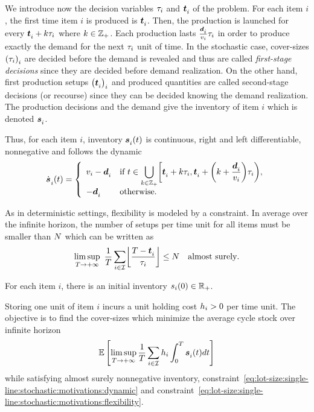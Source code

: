 We introduce now the decision variables $\tau_i$ and $\va t_i$ of the problem.
For each item $i$, the first time item $i$ is produced is $\va t_i$.
Then, the production is launched for every $\va t_i+k\cover_i$ where $k\in\mathbb{Z}_+$.
Each production lasts $\frac{\va\demand_i}{\rate_i}\cover_i$ in order to produce exactly the demand for the next $\tau_i$ unit of time.
In the stochastic case, cover-sizes $\bracket{\cover_i}_i$ are decided before the demand is revealed and thus are called \emph{first-stage decisions} since they are decided before demand realization.
On the other hand, first production setups $\bracket{\va t_i}_i$ and produced quantities are called second-stage decisions (or recourse) since they can be decided knowing the demand realization.
The production decisions and the demand give the inventory of item $i$ which is denoted $\va\inventory_i$.


Thus, for each item $i$, inventory $\va\inventory_i\bracket{t}$ is continuous, right and left differentiable, nonnegative and follows the dynamic
\begin{equation}\label{eq:lot-size:single-line:stochastic:motivations:dynamic}
  \dot{\va\inventory}_i\bracket{t} =
  \left\{
  \begin{array}{ll}
  \rate_i-\va\demand_i
  & \ds\mbox{if}\ t\in\bigcup_{k\in\ZZ_+} \left[\va t_i+k\cover_i,\va t_i+\bracket{k+\frac{\va\demand_i}{\rate_i}}\cover_i\right),
  \\
  -\va\demand_i
  & \mbox{otherwise}.
  \end{array}
  \right.
\end{equation}


As in deterministic settings, flexibility is modeled by a constraint.
In average over the infinite horizon, the number of setups per time unit for all items must be smaller than $N$ which can be written as
\begin{equation}\label{eq:lot-size:single-line:stochastic:motivations:flexibility}
  \limsup_{\horizon\rightarrow+\infty}\ \frac{1}{\horizon} \sum_{i\in\REF} \left\lfloor\frac{\horizon-\va t_i}{\cover_i}\right\rfloor \le \nbsetups \quad \mbox{almost surely}.
\end{equation}


For each item $i$, there is an initial inventory $s_i\bracket{0}\in\RR_+$.


Storing one unit of item $i$ incurs a unit holding cost $h_i>0$ per time unit.
The objective is to find the cover-sizes which minimize the average cycle stock over infinite horizon
\begin{equation}
  \espe\sqbracket{
  \limsup_{\horizon\rightarrow+\infty}
  \frac{1}{\horizon} \sum_{i\in\REF} \holding_i \int_0^{\horizon}\va\inventory_i\bracket{t}dt
  }
\end{equation}
while satisfying almost surely nonnegative inventory, constraint~\eqref{eq:lot-size:single-line:stochastic:motivations:dynamic} and constraint~\eqref{eq:lot-size:single-line:stochastic:motivations:flexibility}.


